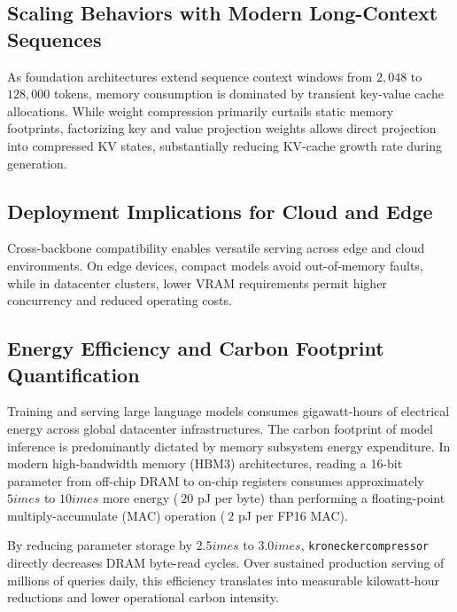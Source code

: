\subsection{Scaling Behaviors with Modern Long-Context Sequences}
As foundation architectures extend sequence context windows from $2{,}048$ to $128{,}000$ tokens, memory consumption is dominated by transient key-value cache allocations. While weight compression primarily curtails static memory footprints, factorizing key and value projection weights allows direct projection into compressed KV states, substantially reducing KV-cache growth rate during generation.

\subsection{Deployment Implications for Cloud and Edge}
Cross-backbone compatibility enables versatile serving across edge and cloud environments. On edge devices, compact models avoid out-of-memory faults, while in datacenter clusters, lower VRAM requirements permit higher concurrency and reduced operating costs.

\subsection{Energy Efficiency and Carbon Footprint Quantification}
Training and serving large language models consumes gigawatt-hours of electrical energy across global datacenter infrastructures. The carbon footprint of model inference is predominantly dictated by memory subsystem energy expenditure. In modern high-bandwidth memory (HBM3) architectures, reading a 16-bit parameter from off-chip DRAM to on-chip registers consumes approximately $5	imes$ to $10	imes$ more energy ($~20$ pJ per byte) than performing a floating-point multiply-accumulate (MAC) operation ($~2$ pJ per FP16 MAC).

By reducing parameter storage by $2.5	imes$ to $3.0	imes$, \texttt{kroneckercompressor} directly decreases DRAM byte-read cycles. Over sustained production serving of millions of queries daily, this efficiency translates into measurable kilowatt-hour reductions and lower operational carbon intensity.
